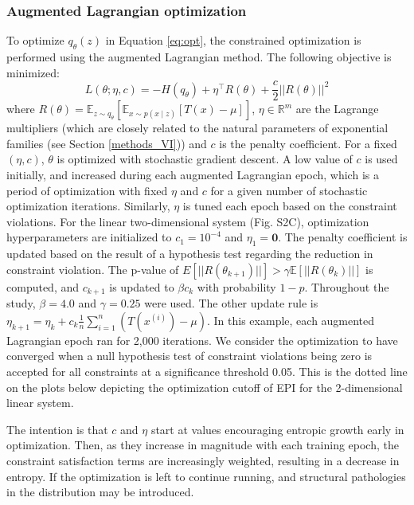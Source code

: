 \documentclass[11pt]{article}
\begin{document}
\subsubsection{Augmented Lagrangian optimization}\label{methods_AL_opt}
To optimize $q_\theta(z)$ in Equation \ref{eq:opt}, the constrained optimization is performed using the augmented Lagrangian method.  The following objective is minimized:
\begin{equation}
L(\theta; \eta, c) = -H(q_\theta) + \eta^\top R(\theta) + \frac{c}{2}||R(\theta)||^2
\end{equation}
where $R(\theta) = \mathbb{E}_{z \sim q_\theta}\left[ \mathbb{E}_{x\sim p(x \mid z)}\left[T(x) - \mu \right] \right]$, $\eta \in \mathbb{R}^m$ are the Lagrange multipliers (which are closely related to the natural parameters of exponential families (see Section \ref{methods_VI})) and $c$ is the penalty coefficient.  For a fixed $(\eta, c)$, $\theta$ is optimized with stochastic gradient descent.  A low value of $c$ is used initially, and increased during each augmented Lagrangian epoch, which is a period of optimization with fixed $\eta$ and $c$ for a given number of stochastic optimization iterations. Similarly, $\eta$ is tuned each epoch based on the constraint violations.  For the linear two-dimensional system (Fig. S2C), optimization hyperparameters are initialized to $c_1 = 10^{-4}$ and $\eta_1 = \textbf{0}$.  The penalty coefficient is updated based on the result of a hypothesis test regarding the reduction in constraint violation.  The p-value of $E[||R(\theta_{k+1})||] > \gamma \mathbb{E} \left[||R(\theta_{k})|| \right]$ is computed, and $c_{k+1}$ is updated  to $\beta c_k$ with probability $1-p$.  Throughout the study, $\beta = 4.0$ and $\gamma = 0.25$ were used.  The other update rule is $\eta_{k+1} = \eta_k + c_k \frac{1}{n} \sum_{i=1}^n (T(x^{(i)}) - \mu)$.  In this example, each augmented Lagrangian epoch ran for 2,000 iterations.  We consider the optimization to have converged when a null hypothesis test of constraint violations being zero is accepted for all constraints at a significance threshold 0.05.  This is the dotted line on the plots below depicting the optimization cutoff of EPI for the 2-dimensional linear system.

The intention is that $c$ and $\eta$ start at values encouraging entropic growth early in optimization.  Then, as they increase in magnitude with each training epoch, the constraint satisfaction terms are increasingly weighted, resulting in a decrease in entropy.   
If the optimization is left to continue running, and structural pathologies in the distribution may be introduced.
\end{document}
